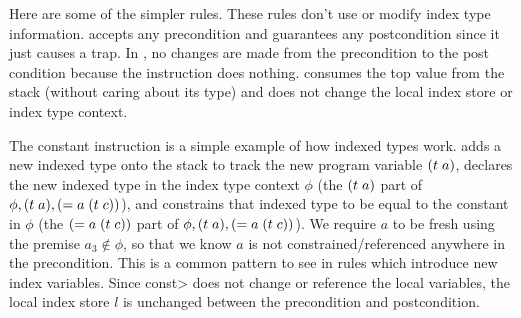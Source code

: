 Here are some of the simpler rules.
These rules don't use or modify index type information.
 accepts any precondition and guarantees any postcondition since it just causes a trap.
In , no changes are made from the precondition to the post condition because the instruction does nothing.
 consumes the top value from the stack (without caring about its type) and does not change the local index store or index type context.
\begin{mathpar}


\end{mathpar}

The constant instruction is a simple example of how indexed types work.
 adds a new indexed type onto the stack to track the new program variable $\ti{t}{a}$, declares the new indexed type in the index type context $\phi$ (the $\ti{t}{a}$ part of $\phi,\ti{t}{a},(= a\; \ti{t}{c})$), and constrains that indexed type to be equal to the constant in $\phi$ (the $(= a\; \ti{t}{c})$ part of $\phi,\ti{t}{a},(= a\; \ti{t}{c})$).
We require $a$ to be fresh using the premise $a_3 \not\in \phi$, so that we know $a$ is not constrained/referenced anywhere in the precondition.
This is a common pattern to see in rules which introduce new index variables.
Since \<const> does not change or reference the local variables, the local index store $l$ is unchanged between the precondition and postcondition.
\begin{mathpar}
\end{mathpar}

